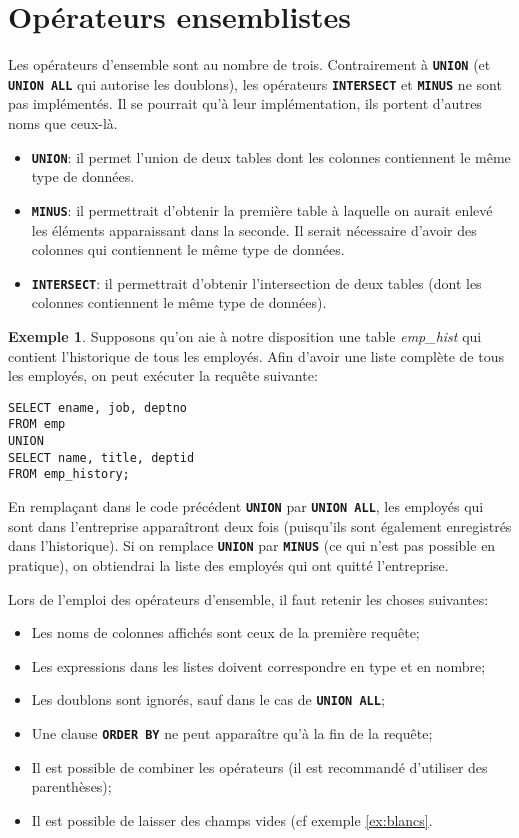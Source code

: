\documentclass[a4paper, 12pt]{report}
\newcommand{\textSQL}[1]{\texttt{\textbf{#1}}}
\theoremstyle{definition} \newtheorem{ex}{Exemple}
\begin{document}
\section{Opérateurs ensemblistes}

Les opérateurs d'ensemble sont au nombre de trois. Contrairement à \textSQL{UNION} (et \textSQL{UNION ALL} qui autorise les doublons), les opérateurs \textSQL{INTERSECT} et \textSQL{MINUS} ne sont pas implémentés. Il se pourrait qu'à leur implémentation, ils portent d'autres noms que ceux-là.
\begin{itemize}
\item \textSQL{UNION}: il permet l'union de deux tables dont les colonnes contiennent le même type de données.
\item \textSQL{MINUS}: il permettrait d'obtenir la première table à laquelle on aurait enlevé les éléments apparaissant dans la seconde. Il serait nécessaire d'avoir des colonnes qui contiennent le même type de données.
\item \textSQL{INTERSECT}: il permettrait d'obtenir l'intersection de deux tables (dont les colonnes contiennent le même type de données).
\end{itemize}

\begin{ex}
Supposons qu'on aie à notre disposition une table \emph{emp\_hist} qui contient l'historique de tous les employés. Afin d'avoir une liste complète de tous les employés, on peut exécuter la requête suivante: 
\begin{lstlisting}[frame=single]
SELECT ename, job, deptno
FROM emp
UNION
SELECT name, title, deptid
FROM emp_history;
\end{lstlisting}
En remplaçant dans le code précédent \textSQL{UNION} par \textSQL{UNION ALL}, les employés qui sont dans l'entreprise apparaîtront deux fois (puisqu'ils sont également enregistrés dans l'historique). Si on remplace \textSQL{UNION} par \textSQL{MINUS} (ce qui n'est pas possible en pratique), on obtiendrai la liste des employés qui ont quitté l'entreprise.
\end{ex}

Lors de l'emploi des opérateurs d'ensemble, il faut retenir les choses suivantes:
\begin{itemize}
\item Les noms de colonnes affichés sont ceux de la première requête;
\item Les expressions dans les listes doivent correspondre en type et en nombre;
\item Les doublons sont ignorés, sauf dans le cas de \textSQL{UNION ALL};
\item Une clause \textSQL{ORDER BY} ne peut apparaître qu'à la fin de la requête;
\item Il est possible de combiner les opérateurs (il est recommandé d'utiliser des parenthèses);
\item Il est possible de laisser des champs vides (cf exemple \ref{ex:blancs}.
\end{itemize}
\end{document}
